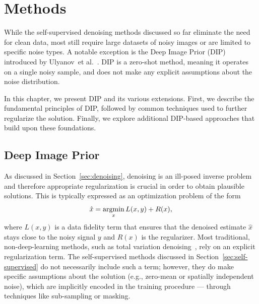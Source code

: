 \chapter{Methods}

While the self-supervised denoising methods discussed so far eliminate the need for clean data, most still require large datasets of noisy images or are limited to specific noise types.
A notable exception is the Deep Image Prior (DIP) introduced by Ulyanov~et al.~\cite{DIP}.
DIP is a zero-shot method, meaning it operates on a single noisy sample, and does not make any explicit assumptions about the noise distribution.

In this chapter, we present DIP and its various extensions.
First, we describe the fundamental principles of DIP, followed by common techniques used to further regularize the solution.
Finally, we explore additional DIP-based approaches that build upon these foundations.

\section{Deep Image Prior}

As discussed in Section~\ref{sec:denoising}, denoising is an ill-posed inverse problem and therefore appropriate regularization is crucial in order to obtain plausible solutions.
This is typically expressed as an optimization problem of the form
\begin{equation}\label{eq:ip-optim}
    \hat{x} = \operatorname*{argmin}_x L(x,y) + R(x),
\end{equation}
where $L(x,y)$ is a data fidelity term that ensures that the denoised estimate $\hat{x}$ stays close to the noisy signal $y$ and $R(x)$ is the regularizer.
Most traditional, non-deep-learning methods, such as total variation denoising~\cite{TV}, rely on an explicit regularization term.
The self-supervised methods discussed in Section~\ref{sec:self-supervised} do not necessarily include such a term; however, they do make specific assumptions about the solution (e.g., zero-mean or spatially independent noise), which are implicitly encoded in the training procedure --- through techniques like sub-sampling or masking.

